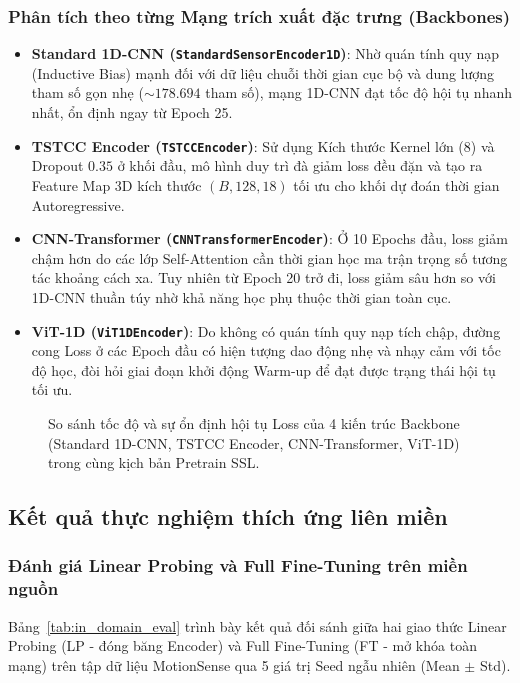 \subsubsection{Phân tích theo từng Mạng trích xuất đặc trưng (Backbones)}

\begin{itemize}
    \item \textbf{Standard 1D-CNN (\texttt{StandardSensorEncoder1D})}: 
    Nhờ quán tính quy nạp (Inductive Bias) mạnh đối với dữ liệu chuỗi thời gian cục bộ và dung lượng tham số gọn nhẹ ($\sim 178.694$ tham số), mạng 1D-CNN đạt tốc độ hội tụ nhanh nhất, ổn định ngay từ Epoch 25.
    
    \item \textbf{TSTCC Encoder (\texttt{TSTCCEncoder})}: 
    Sử dụng Kích thước Kernel lớn ($8$) và Dropout $0.35$ ở khối đầu, mô hình duy trì đà giảm loss đều đặn và tạo ra Feature Map 3D kích thước $(B, 128, 18)$ tối ưu cho khối dự đoán thời gian Autoregressive.
    
    \item \textbf{CNN-Transformer (\texttt{CNNTransformerEncoder})}: 
    Ở 10 Epochs đầu, loss giảm chậm hơn do các lớp Self-Attention cần thời gian học ma trận trọng số tương tác khoảng cách xa. Tuy nhiên từ Epoch 20 trở đi, loss giảm sâu hơn so với 1D-CNN thuần túy nhờ khả năng học phụ thuộc thời gian toàn cục.
    
    \item \textbf{ViT-1D (\texttt{ViT1DEncoder})}: 
    Do không có quán tính quy nạp tích chập, đường cong Loss ở các Epoch đầu có hiện tượng dao động nhẹ và nhạy cảm với tốc độ học, đòi hỏi giai đoạn khởi động Warm-up để đạt được trạng thái hội tụ tối ưu.
\end{itemize}

\begin{figure}[h!]
\centering
\caption{So sánh tốc độ và sự ổn định hội tụ Loss của 4 kiến trúc Backbone (Standard 1D-CNN, TSTCC Encoder, CNN-Transformer, ViT-1D) trong cùng kịch bản Pretrain SSL.}
\label{fig:pretrain_backbone_comparison}
\end{figure}

\subsection{Kết quả thực nghiệm thích ứng liên miền}
\subsubsection{Đánh giá Linear Probing và Full Fine-Tuning trên miền nguồn}
Bảng~\ref{tab:in_domain_eval} trình bày kết quả đối sánh giữa hai giao thức Linear Probing (LP - đóng băng Encoder) và Full Fine-Tuning (FT - mở khóa toàn mạng) trên tập dữ liệu MotionSense qua 5 giá trị Seed ngẫu nhiên (Mean $\pm$ Std).

